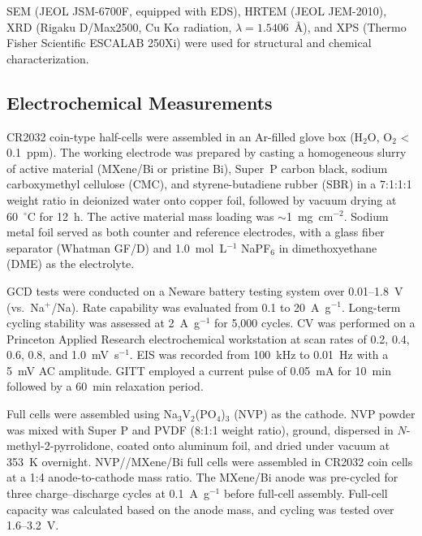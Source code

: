 SEM (JEOL JSM-6700F, equipped with EDS), HRTEM (JEOL JEM-2010), XRD (Rigaku D/Max2500, Cu K$\alpha$ radiation, $\lambda = 1.5406$~\AA), and XPS (Thermo Fisher Scientific ESCALAB 250Xi) were used for structural and chemical characterization.

\subsection{Electrochemical Measurements}

CR2032 coin-type half-cells were assembled in an Ar-filled glove box (H$_{2}$O, O$_{2}$ < 0.1~ppm). The working electrode was prepared by casting a homogeneous slurry of active material (MXene/Bi or pristine Bi), Super~P carbon black, sodium carboxymethyl cellulose (CMC), and styrene-butadiene rubber (SBR) in a 7:1:1:1 weight ratio in deionized water onto copper foil, followed by vacuum drying at 60~$^{\circ}$C for 12~h. The active material mass loading was $\sim$1~mg~cm$^{-2}$. Sodium metal foil served as both counter and reference electrodes, with a glass fiber separator (Whatman GF/D) and 1.0~mol~L$^{-1}$ NaPF$_{6}$ in dimethoxyethane (DME) as the electrolyte.

GCD tests were conducted on a Neware battery testing system over 0.01--1.8~V (vs.\ Na$^{+}$/Na). Rate capability was evaluated from 0.1 to 20~A~g$^{-1}$. Long-term cycling stability was assessed at 2~A~g$^{-1}$ for 5,000 cycles. CV was performed on a Princeton Applied Research electrochemical workstation at scan rates of 0.2, 0.4, 0.6, 0.8, and 1.0~mV~s$^{-1}$. EIS was recorded from 100~kHz to 0.01~Hz with a 5~mV AC amplitude. GITT employed a current pulse of 0.05~mA for 10~min followed by a 60~min relaxation period.

Full cells were assembled using Na$_{3}$V$_{2}$(PO$_{4}$)$_{3}$ (NVP) as the cathode. NVP powder was mixed with Super P and PVDF (8:1:1 weight ratio), ground, dispersed in $N$-methyl-2-pyrrolidone, coated onto aluminum foil, and dried under vacuum at 353~K overnight. NVP//MXene/Bi full cells were assembled in CR2032 coin cells at a 1:4 anode-to-cathode mass ratio. The MXene/Bi anode was pre-cycled for three charge--discharge cycles at 0.1~A~g$^{-1}$ before full-cell assembly. Full-cell capacity was calculated based on the anode mass, and cycling was tested over 1.6--3.2~V.
